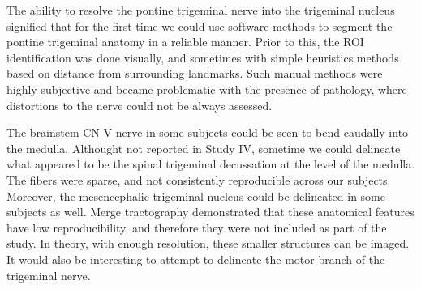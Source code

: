 The ability to resolve the pontine trigeminal nerve into the trigeminal nucleus signified that for the first time we could use software methods to segment the pontine trigeminal anatomy in a reliable manner. Prior to this, the ROI identification was done visually, and sometimes with simple heuristics methods based on distance from surrounding landmarks. Such manual methods were highly subjective and became problematic with the presence of pathology, where distortions to the nerve could not be always assessed. 

The brainstem CN V nerve in some subjects could be seen to bend caudally into the medulla. Althought not reported in Study IV, sometime we could delineate what appeared to be the spinal trigeminal decussation at the level of the medulla. The fibers were sparse, and not consistently reproducible across our subjects. Moreover, the mesencephalic trigeminal nucleus could be delineated in some subjects as well. Merge tractography demonstrated that these anatomical features have low reproducibility, and therefore they were not included as part of the study. In theory, with enough resolution, these smaller structures can be imaged. It would also be interesting to attempt to delineate the motor branch of the trigeminal nerve. 

